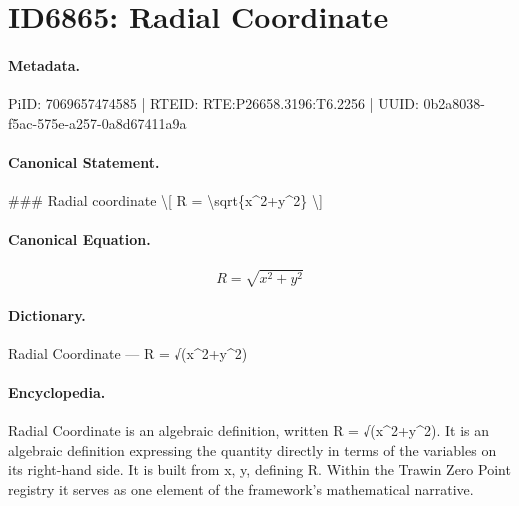 \section*{ID6865: Radial Coordinate}
\paragraph{Metadata.}
PiID: 7069657474585 | RTEID: RTE:P26658.3196:T6.2256 | UUID: 0b2a8038-f5ac-575e-a257-0a8d67411a9a

\paragraph{Canonical Statement.}
\#\#\# Radial coordinate \textbackslash{}[ R = \textbackslash{}sqrt\{x\textasciicircum{}2+y\textasciicircum{}2\} \textbackslash{}]

\paragraph{Canonical Equation.}
\[
R = \sqrt{x^2+y^2}
\]

\paragraph{Dictionary.}
Radial Coordinate — R = √(x\textasciicircum{}2+y\textasciicircum{}2)

\paragraph{Encyclopedia.}
Radial Coordinate is an algebraic definition, written R = √(x\textasciicircum{}2+y\textasciicircum{}2). It is an algebraic definition expressing the quantity directly in terms of the variables on its right-hand side. It is built from x, y, defining R. Within the Trawin Zero Point registry it serves as one element of the framework's mathematical narrative.
